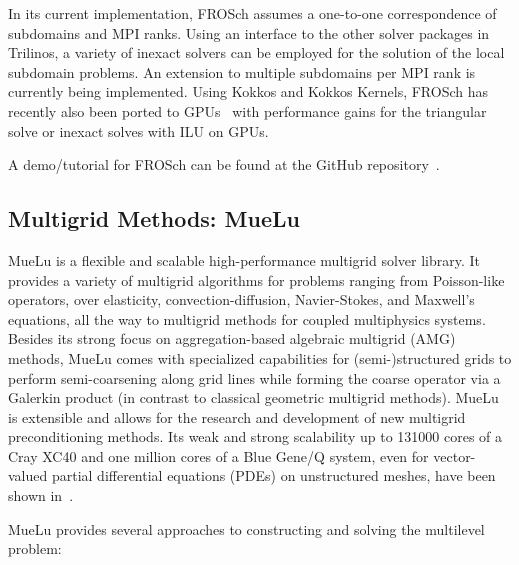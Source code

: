 In its current implementation, FROSch assumes a one-to-one correspondence of subdomains and MPI ranks. Using an interface to the other solver packages in Trilinos, a variety of inexact solvers can be employed for the solution of the local subdomain problems. An extension to multiple subdomains per MPI rank is currently being implemented. Using Kokkos and Kokkos Kernels, FROSch has recently also been ported to GPUs~\cite{yamazaki_experimental_2023} with performance gains for the triangular solve or inexact solves with ILU on GPUs.

A demo/tutorial for FROSch can be found at the GitHub repository~\cite{frosch_demo}.

\subsection{Multigrid Methods: MueLu}

MueLu is a flexible and scalable high-performance multigrid solver library.
It provides a variety of multigrid algorithms for problems ranging from Poisson-like operators, over elasticity, convection-diffusion, Navier-Stokes, and Maxwell's equations,
all the way to multigrid methods for coupled multiphysics systems.
Besides its strong focus on aggregation-based algebraic multigrid (AMG) methods,
MueLu comes with specialized capabilities for (semi-)structured grids to perform semi-coarsening along grid lines
while forming the coarse operator via a Galerkin product (in contrast to classical geometric multigrid methods).
MueLu is extensible and allows for the research and development of new multigrid preconditioning methods.
Its weak and strong scalability up to \num{131000} cores of a Cray XC40 and one million cores of a Blue Gene/Q system, even for vector-valued partial differential equations (PDEs) on unstructured meshes, have been shown in~\cite{Lin2017a,Thomas2019a}.

MueLu provides several approaches to constructing and solving the multilevel problem:

